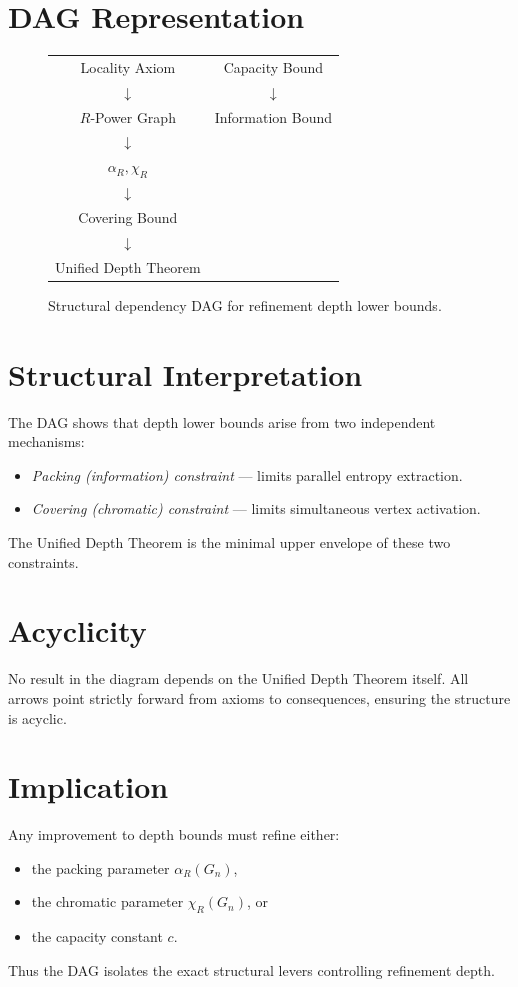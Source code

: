 \section{DAG Representation}

\begin{figure}[h]
\centering
\begin{tabular}{cc}
Locality Axiom & Capacity Bound \\
$\downarrow$ & $\downarrow$ \\
$R$-Power Graph & Information Bound \\
$\downarrow$ & \\
$\alpha_R,\chi_R$ & \\
$\downarrow$ & \\
Covering Bound & \\
$\downarrow$ & \\
Unified Depth Theorem & \\
\end{tabular}
\caption{Structural dependency DAG for refinement depth lower bounds.}
\label{fig:urf-dag}
\end{figure}

\section{Structural Interpretation}

The DAG shows that depth lower bounds arise from two independent mechanisms:

\begin{itemize}
\item \emph{Packing (information) constraint} — limits parallel entropy extraction.
\item \emph{Covering (chromatic) constraint} — limits simultaneous vertex activation.
\end{itemize}

The Unified Depth Theorem is the minimal upper envelope of these two constraints.

\section{Acyclicity}

No result in the diagram depends on the Unified Depth Theorem itself.  
All arrows point strictly forward from axioms to consequences, ensuring the structure is acyclic.

\section{Implication}

Any improvement to depth bounds must refine either:

\begin{itemize}
\item the packing parameter $\alpha_R(G_n)$,
\item the chromatic parameter $\chi_R(G_n)$, or
\item the capacity constant $c$.
\end{itemize}

Thus the DAG isolates the exact structural levers controlling refinement depth.
